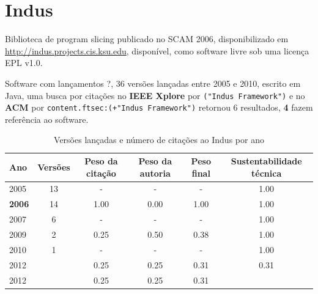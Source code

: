 \section{Indus}

Biblioteca de program slicing
publicado no SCAM 2006,
disponibilizado em \url{http://indus.projects.cis.ksu.edu},
disponível,
como software livre
sob uma licença EPL v1.0.

Software com lançamentos ?,
36 versões lançadas
entre 2005 e 2010,
escrito em Java,
uma busca por citações no {\bf IEEE Xplore} por
\texttt{("Indus Framework")}
e no {\bf ACM} por
\texttt{content.ftsec:(+"Indus Framework")}
retornou
6 resultados,
{\bf 4} fazem referência ao software.


\begin{table}[H]
\caption{Versões lançadas e número de citações ao Indus por ano}
\centering
\begin{tabular}{| l | c | c | c | c | c |}
  \hline
  Ano & Versões & Peso da citação & Peso da autoria & Peso final & Sustentabilidade técnica \\
  \hline
        2005 & 13 & - & - & -
        &
          {\color{blue} 1.00}
        \\
\hline
            {\bf 2006}
          &
          14
          &
          1.00
          &
          0.00
          &
          1.00
          &
            {\color{blue} 1.00}
          \\
\hline
        2007 & 6 & - & - & -
        &
          {\color{blue} 1.00}
        \\
\hline
            2009
          &
          2
          &
          0.25
          &
          0.50
          &
          0.38
          &
            {\color{blue} 1.00}
          \\
\hline
        2010 & 1 & - & - & -
        &
          {\color{blue} 1.00}
        \\
\hline
            2012
          &
          
          &
          0.25
          &
          0.25
          &
          0.31
          &
            {\color{red} 0.31}
          \\
            2012
          &
          
          &
          0.25
          &
          0.25
          &
          0.31
          &
          \\
\hline
\end{tabular}
\end{table}

